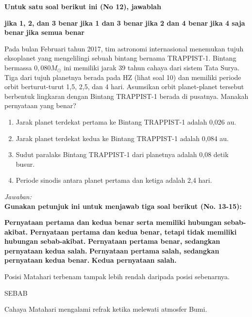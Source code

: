 \documentclass[11pt,fleqn]{exam}
\begin{document}
\begin{questions}
\vspace{0.5cm}
\textbf{Untuk satu soal berikut ini (No 12), jawablah}
\begin{choices}
\choice \textbf{jika 1, 2, dan 3 benar}
\choice \textbf{jika 1 dan 3 benar}
\choice \textbf{jika 2 dan 4 benar}
\choice \textbf{jika 4 saja benar}
\choice \textbf{jika semua benar}
\end{choices}
\question Pada bulan Februari tahun 2017, tim astronomi internasional menemukan tujuh eksoplanet yang mengelilingi sebuah bintang bernama TRAPPIST-1. Bintang bermassa $0,080 M_{\odot}$ ini memiliki jarak 39 tahun cahaya dari sistem Tata Surya. Tiga dari tujuh planetnya berada pada HZ (lihat soal 10) dan memiliki periode orbit berturut-turut 1,5, 2,5, dan 4 hari. Asumsikan orbit planet-planet tersebut berbentuk lingkaran dengan Bintang TRAPPIST-1 berada di pusatnya. Manakah pernyataan yang benar?
\begin{enumerate}
\item Jarak planet terdekat pertama ke Bintang TRAPPIST-1 adalah 0,026 au.
\item Jarak planet terdekat kedua ke Bintang TRAPPIST-1 adalah 0,084 au.
\item Sudut paralaks Bintang TRAPPIST-1 dari planetnya adalah 0,08 detik busur.
\item Periode sinodis antara planet pertama dan ketiga adalah 2,4 hari.
\end{enumerate}

\textit{Jawaban: }\\

\vspace{0.5cm}
\textbf{Gunakan petunjuk ini untuk menjawab tiga soal berikut (No. 13-15):}
\begin{choices}
\choice \textbf{Pernyataan pertama dan kedua benar serta memiliki hubungan sebab-akibat.}
\choice \textbf{Pernyataan pertama dan kedua benar, tetapi tidak memiliki hubungan sebab-akibat.}
\choice \textbf{Pernyataan pertama benar, sedangkan pernyataan kedua salah.}
\choice \textbf{Pernyataan pertama salah, sedangkan pernyataan kedua benar.}
\choice \textbf{Kedua pernyataan salah.}
\end{choices}

\question Posisi Matahari terbenam tampak lebih rendah daripada posisi sebenarnya.
\begin{center}
SEBAB
\end{center}
Cahaya Matahari mengalami refrak ketika melewati atmosfer Bumi.\\


\end{questions}
\end{document}
